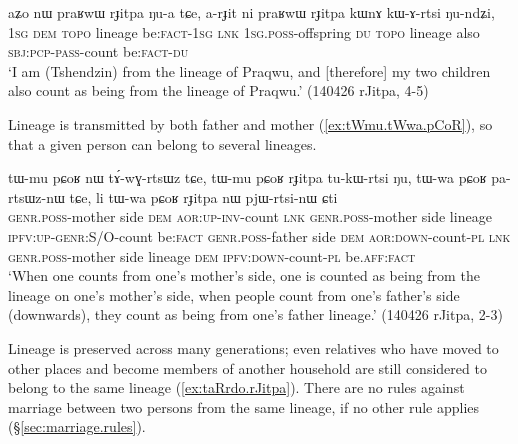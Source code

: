 \begin{exe}
\ex \label{ex:praRwW.rJitpa}
\gll   aʑo nɯ praʁwɯ rɟitpa ŋu-a tɕe, a-rɟit ni praʁwɯ rɟitpa kɯnɤ kɯ-ɤ-rtsi ŋu-ndʑi, \\
\textsc{1sg} \textsc{dem}  \textsc{topo} lineage be:\textsc{fact}-\textsc{1sg} \textsc{lnk} \textsc{1sg}.\textsc{poss}-offspring \textsc{du}  \textsc{topo} lineage also \textsc{sbj}:\textsc{pcp}-\textsc{pass}-count be:\textsc{fact}-\textsc{du} \\
\glt  `I am (Tshendzin) from the lineage of Praqwu, and [therefore] my two children also count as being from the lineage of Praqwu.' (140426 rJitpa, 4-5)
\end{exe}

Lineage is transmitted by both father and mother (\ref{ex:tWmu.tWwa.pCoR}), so that a given person can belong to several lineages.

\begin{exe}
\ex \label{ex:tWmu.tWwa.pCoR}
\gll   tɯ-mu pɕoʁ nɯ tɤ́-wɣ-rtsɯz tɕe, tɯ-mu pɕoʁ rɟitpa tu-kɯ-rtsi ŋu, tɯ-wa pɕoʁ pa-rtsɯz-nɯ tɕe, li tɯ-wa pɕoʁ rɟitpa nɯ pjɯ-rtsi-nɯ ɕti   \\
\textsc{genr}.\textsc{poss}-mother side \textsc{dem} \textsc{aor}:\textsc{up}-\textsc{inv}-count \textsc{lnk} \textsc{genr}.\textsc{poss}-mother side lineage \textsc{ipfv}:\textsc{up}-\textsc{genr}:S/O-count be:\textsc{fact}  \textsc{genr}.\textsc{poss}-father side \textsc{dem} \textsc{aor}:\textsc{down}-count-\textsc{pl} \textsc{lnk} \textsc{genr}.\textsc{poss}-mother side lineage \textsc{dem} \textsc{ipfv}:\textsc{down}-count-\textsc{pl} be.\textsc{aff}:\textsc{fact}  \\
\glt  `When one counts from  one's mother's side, one is counted as being from the lineage on one's mother's side, when people count from one's father's side (downwards), they count as being from one's father lineage.' (140426 rJitpa, 2-3)
 \end{exe}

Lineage is preserved across many generations; even relatives who have moved to other places and become members of another household are still considered to belong to the same lineage (\ref{ex:taRrdo.rJitpa}). There are no rules against marriage between two persons from the same lineage, if no other rule applies (§\ref{sec:marriage.rules}).

